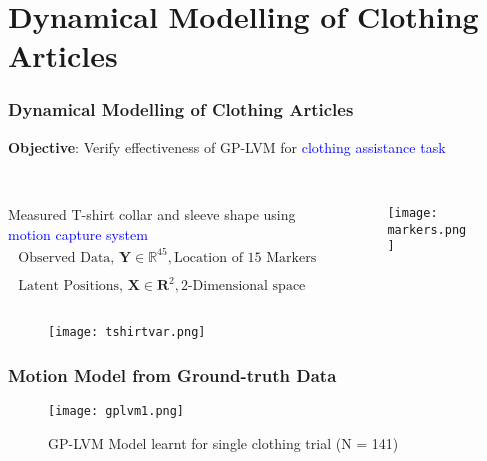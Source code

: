 \documentclass[10pt,handout]{beamer}
\begin{document}
\section[Modelling using GP-LVM]{Dynamical Modelling of Clothing Articles}

\begin{frame}
\frametitle{Dynamical Modelling of Clothing Articles}

\centering
\textbf{Objective}: Verify effectiveness of GP-LVM for \textcolor{blue}{clothing assistance task}\\~\\

\begin{columns}
  \begin{column}[c]{0.6\textwidth}
    \centering
    Measured T-shirt collar and sleeve shape using \textcolor{blue}{motion capture system}
    \begin{equation*}
      \begin{array}{c}
        \text{Observed Data, } \mathbf{Y} \in \mathbb{R}^{45}, \text{Location of 15 Markers}\\~\\
        \text{Latent Positions, } \mathbf{X} \in \mathbf{R}^{2}, \text{2-Dimensional space}
      \end{array}
    \end{equation*}
  \end{column}
  \begin{column}[c]{0.4\textwidth}
    \centering
    \begin{figure}
      \texttt{[image: markers.png]}
    \end{figure}
  \end{column}
\end{columns}

\begin{figure}
  \centering
  \texttt{[image: tshirtvar.png]}
\end{figure}

\end{frame}

\begin{frame}
\frametitle{Motion Model from Ground-truth Data}

\begin{figure}
  \centering
  \caption*{GP-LVM Model learnt for single clothing trial (N = 141)}
  \texttt{[image: gplvm1.png]}
\end{figure}

\end{frame}
\end{document}
